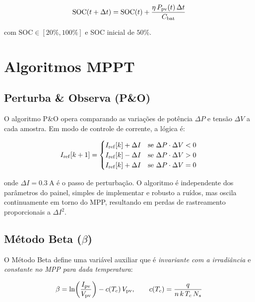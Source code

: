 \documentclass[11pt,a4paper]{article}
\begin{document}
\begin{equation}
  \mathrm{SOC}(t + \Delta t) = \mathrm{SOC}(t)
    + \frac{\eta\, P_{\rm pv}(t)\,\Delta t}{C_{\rm bat}}
\end{equation}

\noindent com $\mathrm{SOC} \in [20\%, 100\%]$ e SOC inicial de $50\%$.

\section{Algoritmos MPPT}

\subsection{Perturba \& Observa (P\&O)}

O algoritmo P\&O \cite{esram2007comparison} opera comparando as variações de
potência $\Delta P$ e tensão $\Delta V$ a cada amostra. Em modo de controle de
corrente, a lógica é:

\begin{equation}
  I_{\rm ref}[k+1] =
  \begin{cases}
    I_{\rm ref}[k] + \Delta I & \text{se } \Delta P \cdot \Delta V < 0 \\
    I_{\rm ref}[k] - \Delta I & \text{se } \Delta P \cdot \Delta V > 0 \\
    I_{\rm ref}[k] + \Delta I & \text{se } \Delta P \cdot \Delta V = 0
  \end{cases}
  \label{eq:po}
\end{equation}

\noindent onde $\Delta I = \SI{0,3}{\ampere}$ é o passo de perturbação. O
algoritmo é independente dos parâmetros do painel, simples de implementar e robusto
a ruídos, mas oscila continuamente em torno do MPP, resultando em perdas de
rastreamento proporcionais a $\Delta I^2$.

\subsection{Método Beta ($\beta$)}

O Método Beta \cite{jain2004new} define uma variável auxiliar que é
\emph{invariante com a irradiância} e \emph{constante no MPP para dada
temperatura}:

\begin{equation}
  \beta = \ln\!\left(\frac{I_{\rm pv}}{V_{\rm pv}}\right) - c(T_c)\,V_{\rm pv},
  \qquad
  c(T_c) = \frac{q}{n\,k\,T_c\,N_s}
  \label{eq:beta}
\end{equation}
\end{document}
